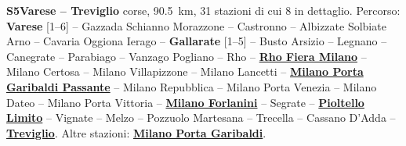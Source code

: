 \medskip\noindent\hypertarget{lin:S5}{\textbf{S5\enspace Varese -- Treviglio}} corse, \SI{90,5}{\km}, 31 stazioni di cui 8 in dettaglio. Percorso: \hypertarget{sta:S01205}{\textbf{Varese}} [1--6] -- Gazzada Schianno Morazzone -- Castronno -- Albizzate Solbiate Arno -- Cavaria Oggiona Ierago -- \hypertarget{sta:S01030}{\textbf{Gallarate}} [1--5] -- Busto Arsizio -- Legnano -- Canegrate -- Parabiago -- Vanzago Pogliano -- Rho -- \hyperlink{sta:S01039}{\textbf{Rho Fiera Milano}} -- Milano Certosa -- Milano Villapizzone -- Milano Lancetti -- \hyperlink{sta:S01647}{\textbf{Milano Porta Garibaldi Passante}} -- Milano Repubblica -- Milano Porta Venezia -- Milano Dateo -- Milano Porta Vittoria -- \hyperlink{sta:S01492}{\textbf{Milano Forlanini}} -- Segrate -- \hyperlink{sta:S01703}{\textbf{Pioltello Limito}} -- Vignate -- Melzo -- Pozzuolo Martesana -- Trecella -- Cassano D'Adda -- \hyperlink{sta:S01708}{\textbf{Treviglio}}. Altre stazioni: \hyperlink{sta:S01645}{\textbf{Milano Porta Garibaldi}}.
